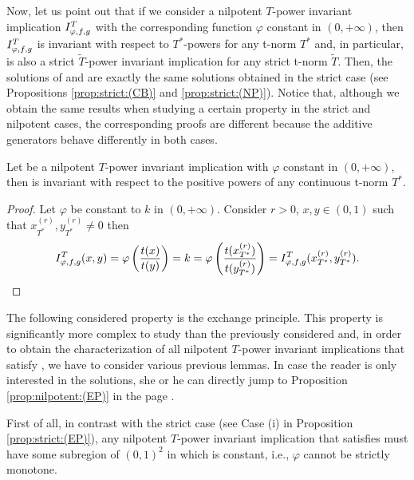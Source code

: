 Now, let us point out that if we consider a nilpotent $T$-power invariant implication $I^T_{\varphi,f,g}$ with the corresponding function $\varphi$ constant in $(0,+\infty)$, then $I^T_{\varphi,f,g}$ is invariant with respect to $T^*$-powers for any t-norm $T^*$ and, in particular, \IT is also a strict $\tilde{T}$-power invariant implication for any strict t-norm $\tilde{T}$. Then, the solutions of \CB and \NP are exactly the same solutions obtained in the strict case (see Propositions \ref{prop:strict:(CB)} and \ref{prop:strict:(NP)}). Notice that, although we obtain the same results when studying a certain property in the strict and nilpotent cases, the corresponding proofs are different because the additive generators behave differently in both cases.

\begin{lemma}\label{lem:nilpotent:InvariantVarphiConstant}
	Let \IT be a nilpotent $T$-power invariant implication with $\varphi$ constant in $(0,+\infty)$, then \IT is invariant with respect to the positive powers of any continuous t-norm $T^*$.
\end{lemma}

\begin{proof}
	Let $\varphi$ be constant to $k$ in $(0,+\infty)$. Consider $r>0$, $x,y \in (0,1)$ such that $x_{T^*}^{(r)}, y_{T^*}^{(r)} \not = 0$ then
	$$I^T_{\varphi,f,g}(x,y)=\varphi \left(\frac{t(x)}{t(y)}\right) = k = \varphi \left(\frac{t(x_{T^*}^{(r)})}{t(y_{T^*}^{(r)})}\right) = I^T_{\varphi,f,g}(x_{T^*}^{(r)},y_{T^*}^{(r)}).$$
\end{proof}


The following considered property is the exchange principle. This property is significantly more complex to study than the previously considered and, in order to obtain the characterization of all nilpotent $T$-power invariant implications that satisfy \EP, we have to consider various previous lemmas. In case the reader is only interested in the solutions, she or he can directly jump to Proposition \ref{prop:nilpotent:(EP)} in the page \pageref{prop:nilpotent:(EP)}.

First of all, in contrast with the strict case (see Case (i) in Proposition \ref{prop:strict:(EP)}), any nilpotent $T$-power invariant implication that satisfies \EP must have some subregion of $(0,1)^2$ in which is constant, i.e., $\varphi$ cannot be strictly monotone.



